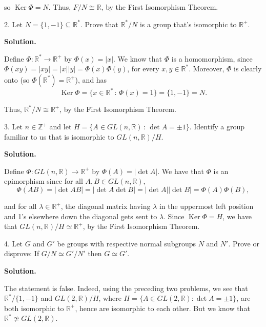 \documentclass[10pt,]{book}
\theoremstyle{plain}
\theoremstyle{definition}
\theoremstyle{definition}
\theoremstyle{definition}
\theoremstyle{definition}
\numberwithin{equation}{section}
\def\Z{\mathbb{Z}}
\def\R{\mathbb{R}}
\DeclareMathOperator{\Ker}{Ker}
\begin{document}
\begin{exerciselist}
      so \(\Ker
      \Phi=N\). Thus, \(F/N \cong \R\), by the First Isomorphism Theorem.
\item[2.]\hypertarget{exercise-60}{}
        Let \(N=\{1,-1\}\subseteq \R^*\). Prove that \(\R^*/N\) is
        a group that's isomorphic to
        \(\R^+\).
\par\smallskip
\par\smallskip
\noindent\textbf{Solution.}\hypertarget{solution-60}{}\quad

      Define \(\Phi: \R^* \rightarrow \R^+\) by
      \(\Phi(x)=|x|\). We know that \(\Phi\) is a homomorphism, since
      \(\Phi(xy)=|xy|=|x||y|=\Phi(x)\Phi(y)\), for every \(x,y\in \R^*\).
      Moreover, \(\Phi\) is clearly onto (so \(\Phi(\R^*)=\R^+\)), and
      has
\begin{equation*}

        \Ker \Phi=\{x\in \R^*\,:\,\Phi(x)=1\}=\{1,-1\}=N.
      
\end{equation*}

\par

      Thus,
      \(\R^*/N \cong \R^+\), by the First Isomorphism Theorem.
\item[3.]\hypertarget{exercise-61}{}
        Let \(n\in \Z^+\) and let \(H=\{A\in GL(n,\R)\,:\, \det A =\pm
        1\}\). Identify a group familiar to us that is isomorphic to
        \(GL(n,\R)/H\).
\par\smallskip
\par\smallskip
\noindent\textbf{Solution.}\hypertarget{solution-61}{}\quad

      Define \(\Phi:GL(n,\R)\to \R^+\) by
      \(\Phi(A)=|\det A|\). We have that \(\Phi\) is an epimorphism since for
      all \(A,B\in GL(n,\R)\),
\begin{equation*}

        \Phi(AB)=|\det AB|=|\det A \det B|=|\det
        A||\det B|=\Phi(A)\Phi(B),
      
\end{equation*}

      and for all \(\lambda \in \R^+\), the
      diagonal matrix having \(\lambda\) in the uppermost left position and
      1's elsewhere down the diagonal gets sent to \(\lambda\). Since \(\Ker
      \Phi=H\), we have that \(GL(n,\R)/H \simeq \R^+\), by the First
      Isomorphism Theorem.
\item[4.]\hypertarget{exercise-62}{}
        Let \(G\) and \(G'\) be groups with respective normal subgroups
        \(N\) and \(N'\). Prove or disprove: If \(G/N\simeq G'/N'\) then \(G\simeq
        G'\).
\par\smallskip
\par\smallskip
\noindent\textbf{Solution.}\hypertarget{solution-62}{}\quad

      The statement is false. Indeed, using the preceding two problems, we see that \(\R^*/\{1,-1\}\) and \(GL(2,\R)/H\),
      where \(H=\{A\in GL(2,\R):\det A =\pm 1\}\), are both isomorphic
      to \(\R^+\), hence are isomorphic to each other. But we know that
      \(\R^* \not\simeq GL(2,\R)\).
\end{exerciselist}
\end{document}
